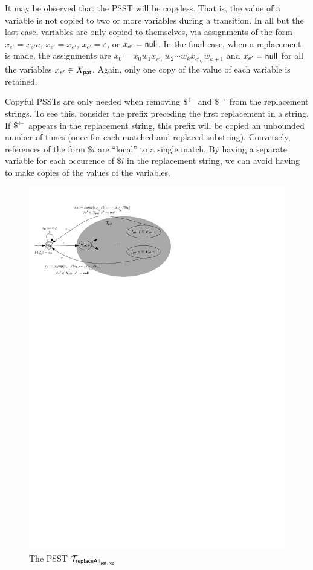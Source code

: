 It may be observed that the PSST will be copyless.
That is, the value of a variable is not copied to two or more variables during a transition.
In all but the last case, variables are only copied to themselves, via assignments of the form $x_{e'} = x_{e'} a$, $x_{e'} = x_{e'}$, $x_{e'} = \varepsilon$, or $x_{e'} = \mathsf{null}$.
In the final case, when a replacement is made, the assignments are
$x_0 = x_0 w_1 x_{e'_{i_1}} w_2 \cdots w_k x_{e'_{i_k}} w_{k+1}$
and
$x_{e'} = \mathsf{null}$ for all the variables $x_{e'} \in X_{\mathsf{pat}}$.
Again, only one copy of the value of each variable is retained.

Copyful PSSTs are only needed when removing $\$^{\leftarrow}$ and $\$^{\rightarrow}$ from the replacement strings.
To see this, consider the prefix preceding the first replacement in a string.
If $\$^{\leftarrow}$ appears in the replacement string, this prefix will be copied an unbounded number of times (once for each matched and replaced substring).
Conversely, references of the form $\$i$ are ``local'' to a single match.
By having a separate variable for each occurence of $\$i$ in the replacement string, we can avoid having to make copies of the values of the variables.

\begin{figure}[ht]
	\vspace{-2mm}
    \centering
    \includegraphics[scale=0.7]{psst-replaceall.pdf}
    \caption{The PSST $\mathcal{T}_{\mathsf{replaceAll}_{\mathsf{pat},\mathsf{rep}}}$}
    \label{fig-psst-replaceall}
    \vspace{-2mm}
\end{figure}


